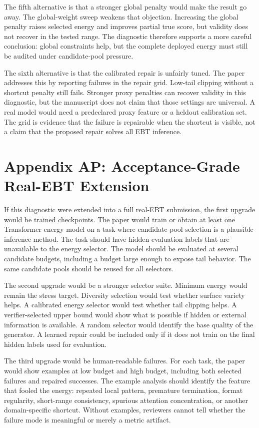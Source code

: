 \documentclass{article}
\begin{document}
The fifth alternative is that a stronger global penalty would make the result
go away. The global-weight sweep weakens that objection. Increasing the global
penalty raises selected energy and improves partial true score, but validity
does not recover in the tested range. The diagnostic therefore supports a
more careful conclusion: global constraints help, but the complete deployed
energy must still be audited under candidate-pool pressure.

The sixth alternative is that the calibrated repair is unfairly tuned. The
paper addresses this by reporting failures in the repair grid. Low-tail
clipping without a shortcut penalty still fails. Stronger proxy penalties can
recover validity in this diagnostic, but the manuscript does not claim that
those settings are universal. A real model would need a predeclared proxy
feature or a heldout calibration set. The grid is evidence that the failure is
repairable when the shortcut is visible, not a claim that the proposed repair
solves all EBT inference.

\section*{Appendix AP: Acceptance-Grade Real-EBT Extension}

If this diagnostic were extended into a full real-EBT submission, the first
upgrade would be trained checkpoints. The paper would train or obtain at least
one Transformer energy model on a task where candidate-pool selection is a
plausible inference method. The task should have hidden evaluation labels that
are unavailable to the energy selector. The model should be evaluated at
several candidate budgets, including a budget large enough to expose tail
behavior. The same candidate pools should be reused for all selectors.

The second upgrade would be a stronger selector suite. Minimum energy would
remain the stress target. Diversity selection would test whether surface
variety helps. A calibrated energy selector would test whether tail clipping
helps. A verifier-selected upper bound would show what is possible if hidden
or external information is available. A random selector would identify the
base quality of the generator. A learned repair could be included only if it
does not train on the final hidden labels used for evaluation.

The third upgrade would be human-readable failures. For each task, the paper
would show examples at low budget and high budget, including both selected
failures and repaired successes. The example analysis should identify the
feature that fooled the energy: repeated local pattern, premature termination,
format regularity, short-range consistency, spurious attention concentration,
or another domain-specific shortcut. Without examples, reviewers cannot tell
whether the failure mode is meaningful or merely a metric artifact.
\end{document}
